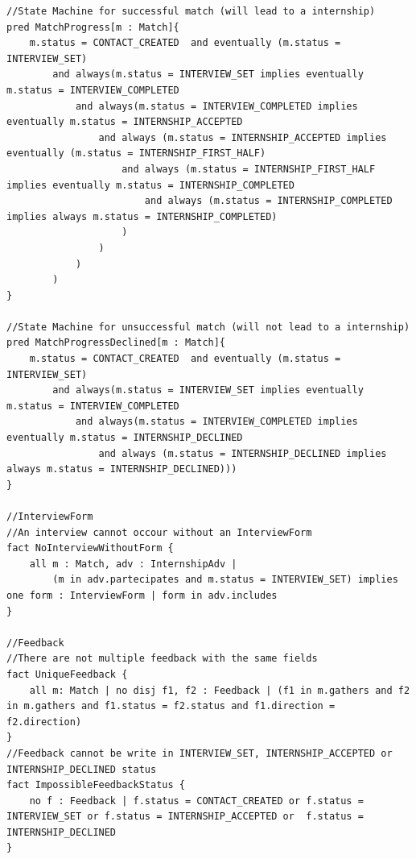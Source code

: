 \begin{lstlisting}
//State Machine for successful match (will lead to a internship)
pred MatchProgress[m : Match]{
	m.status = CONTACT_CREATED  and eventually (m.status = INTERVIEW_SET)
		and always(m.status = INTERVIEW_SET implies eventually m.status = INTERVIEW_COMPLETED
			and always(m.status = INTERVIEW_COMPLETED implies eventually m.status = INTERNSHIP_ACCEPTED
				and always (m.status = INTERNSHIP_ACCEPTED implies eventually (m.status = INTERNSHIP_FIRST_HALF)
					and always (m.status = INTERNSHIP_FIRST_HALF implies eventually m.status = INTERNSHIP_COMPLETED
						and always (m.status = INTERNSHIP_COMPLETED implies always m.status = INTERNSHIP_COMPLETED)
					)
				)
			)
		)
}

//State Machine for unsuccessful match (will not lead to a internship)
pred MatchProgressDeclined[m : Match]{
	m.status = CONTACT_CREATED  and eventually (m.status = INTERVIEW_SET)
		and always(m.status = INTERVIEW_SET implies eventually m.status = INTERVIEW_COMPLETED
			and always(m.status = INTERVIEW_COMPLETED implies eventually m.status = INTERNSHIP_DECLINED
				and always (m.status = INTERNSHIP_DECLINED implies always m.status = INTERNSHIP_DECLINED)))
}

//InterviewForm
//An interview cannot occour without an InterviewForm
fact NoInterviewWithoutForm {
	all m : Match, adv : InternshipAdv |
		(m in adv.partecipates and m.status = INTERVIEW_SET) implies one form : InterviewForm | form in adv.includes 
}

//Feedback
//There are not multiple feedback with the same fields
fact UniqueFeedback {
	all m: Match | no disj f1, f2 : Feedback | (f1 in m.gathers and f2 in m.gathers and f1.status = f2.status and f1.direction = f2.direction)
}
//Feedback cannot be write in INTERVIEW_SET, INTERNSHIP_ACCEPTED or INTERNSHIP_DECLINED status
fact ImpossibleFeedbackStatus {
	no f : Feedback | f.status = CONTACT_CREATED or f.status = INTERVIEW_SET or f.status = INTERNSHIP_ACCEPTED or  f.status = INTERNSHIP_DECLINED
}


\end{lstlisting}

